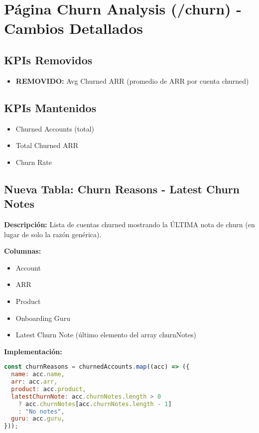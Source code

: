 \documentclass[12pt,a4paper]{article}
\begin{document}
\section{Página Churn Analysis (/churn) - Cambios Detallados}

\subsection{KPIs Removidos}
\begin{itemize}
    \item \textbf{REMOVIDO:} Avg Churned ARR (promedio de ARR por cuenta churned)
\end{itemize}

\subsection{KPIs Mantenidos}
\begin{itemize}
    \item Churned Accounts (total)
    \item Total Churned ARR
    \item Churn Rate
\end{itemize}

\subsection{Nueva Tabla: Churn Reasons - Latest Churn Notes}

\textbf{Descripción:} Lista de cuentas churned mostrando la ÚLTIMA nota de churn (en lugar de solo la razón genérica).

\textbf{Columnas:}
\begin{itemize}
    \item Account
    \item ARR
    \item Product
    \item Onboarding Guru
    \item Latest Churn Note (último elemento del array churnNotes)
\end{itemize}

\textbf{Implementación:}
\begin{lstlisting}[language=JavaScript]
const churnReasons = churnedAccounts.map((acc) => ({
  name: acc.name,
  arr: acc.arr,
  product: acc.product,
  latestChurnNote: acc.churnNotes.length > 0
    ? acc.churnNotes[acc.churnNotes.length - 1]
    : "No notes",
  guru: acc.guru,
}));
\end{lstlisting}
\end{document}
